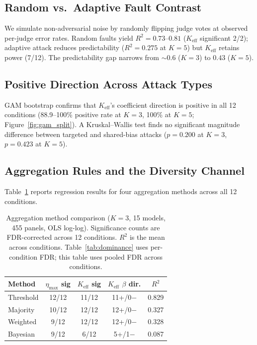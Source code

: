 \subsection{Random vs.\ Adaptive Fault Contrast}
\label{sec:rf_contrast}

We simulate non-adversarial noise by randomly flipping judge votes at observed per-judge error rates. Random faults yield $R^2 = 0.73$--$0.81$ ($K_{\mathrm{eff}}$ significant 2/2); adaptive attack reduces predictability ($R^2{=}0.275$ at $K{=}5$) but $K_{\mathrm{eff}}$ retains power (7/12). The predictability gap narrows from ${\sim}0.6$ ($K{=}3$) to $0.43$ ($K{=}5$).

\subsection{Positive Direction Across Attack Types}
\label{sec:gam_taxonomy}

GAM bootstrap confirms that $K_{\mathrm{eff}}$'s coefficient direction is positive in all 12 conditions (88.9--100\% positive rate at $K{=}3$, 100\% at $K{=}5$; Figure~\ref{fig:gam_split}). A Kruskal--Wallis test finds no significant magnitude difference between targeted and shared-bias attacks ($p{=}0.200$ at $K{=}3$, $p{=}0.423$ at $K{=}5$).

\subsection{Aggregation Rules and the Diversity Channel}
\label{sec:aggregation}

Table~\ref{tab:aggregation} reports regression results for four aggregation methods across all 12 conditions.

\begin{table}[t]
\centering
\small
\begin{tabular}{lcccc}
\toprule
\textbf{Method} & \textbf{$\eta_{\max}$ sig} & \textbf{$K_{\mathrm{eff}}$ sig} & \textbf{$K_{\mathrm{eff}}$ $\beta$ dir.} & \textbf{$R^2$} \\
\midrule
Threshold       & 12/12 & 11/12 & 11+/0$-$  & 0.829 \\
Majority        & 10/12 & 12/12 & 12+/0$-$  & 0.327 \\
Weighted        & 9/12  & 12/12 & 12+/0$-$  & 0.328 \\
Bayesian        & 9/12  & 6/12  & 5+/1$-$   & 0.087 \\
\bottomrule
\end{tabular}
\caption{Aggregation method comparison ($K{=}3$, 15 models, 455 panels, OLS log-log). Significance counts are FDR-corrected across 12 conditions. $R^2$ is the mean across conditions. Table~\ref{tab:dominance} uses per-condition FDR; this table uses pooled FDR across conditions.}
\label{tab:aggregation}
\end{table}


